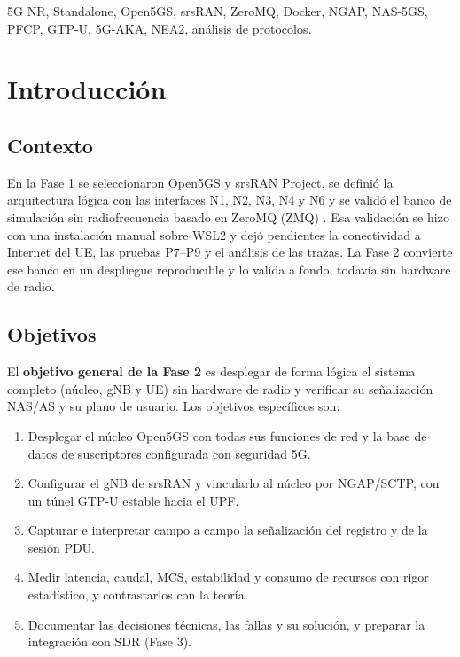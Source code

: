 \documentclass[conference]{IEEEtran}
\begin{document}
\begin{IEEEkeywords}
5G NR, Standalone, Open5GS, srsRAN, ZeroMQ, Docker, NGAP, NAS-5GS, PFCP, GTP-U, 5G-AKA, NEA2, análisis de protocolos.
\end{IEEEkeywords}

\section{Introducción}
\label{sec:intro}

\subsection{Contexto}
En la Fase 1 se seleccionaron Open5GS y srsRAN Project, se definió la arquitectura lógica con las interfaces N1, N2, N3, N4 y N6 y se validó el banco de simulación sin radiofrecuencia basado en ZeroMQ (ZMQ) \cite{srsran,open5gs,zeromq}. Esa validación se hizo con una instalación manual sobre WSL2 y dejó pendientes la conectividad a Internet del UE, las pruebas P7--P9 y el análisis de las trazas. La Fase 2 convierte ese banco en un despliegue reproducible y lo valida a fondo, todavía sin hardware de radio.

\subsection{Objetivos}
El \textbf{objetivo general de la Fase 2} es desplegar de forma lógica el sistema completo (núcleo, gNB y UE) sin hardware de radio y verificar su señalización NAS/AS y su plano de usuario. Los objetivos específicos son:
\begin{enumerate}
  \item Desplegar el núcleo Open5GS con todas sus funciones de red y la base de datos de suscriptores configurada con seguridad 5G.
  \item Configurar el gNB de srsRAN y vincularlo al núcleo por NGAP/SCTP, con un túnel GTP-U estable hacia el UPF.
  \item Capturar e interpretar campo a campo la señalización del registro y de la sesión PDU.
  \item Medir latencia, caudal, MCS, estabilidad y consumo de recursos con rigor estadístico, y contrastarlos con la teoría.
  \item Documentar las decisiones técnicas, las fallas y su solución, y preparar la integración con SDR (Fase 3).
\end{enumerate}
\end{document}
